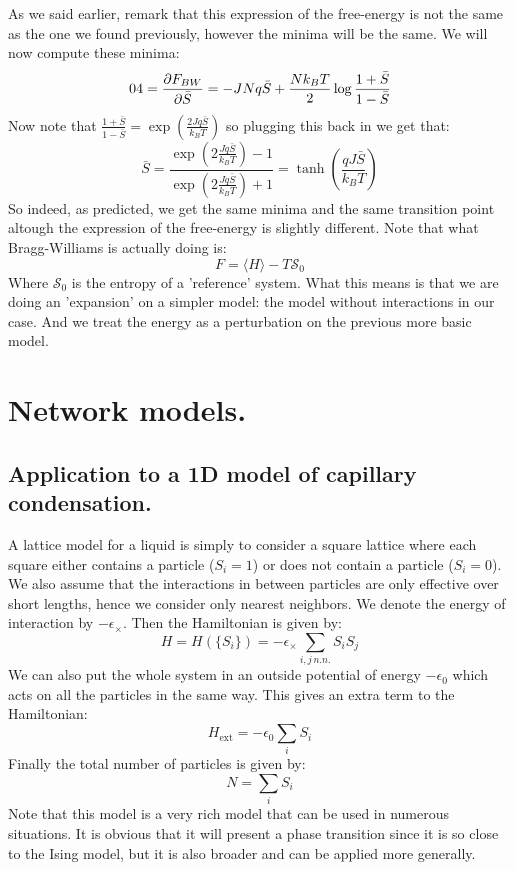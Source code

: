 \documentclass[10pt,a4paper]{book}
\begin{document}
As we said earlier, remark that this expression of the free-energy is not the same as the one we found previously, however the minima will be the same. We will now compute these minima:
\[
04 = \pdv{F_{BW}}{\bar{S}} = - J N q \bar{S} + \frac{N k_B T}{2} \log \frac{1 + \bar{S}}{1 - \bar{S}}
\]
Now note that $\frac{1 + \bar{S}}{1 - \bar{S}} = \exp(\frac{2 J q \bar{S}}{k_B T})$ so plugging this back in we get that:
\[
\bar{S} = \frac{\exp(2 \frac{J q \bar{S}}{k_B T}) - 1}{\exp(2\frac{J q \bar{S}}{k_B T}) + 1} = \tanh(\frac{q J \bar{S}}{k_B T})
\]
So indeed, as predicted, we get the same minima and the same transition point altough the expression of the free-energy is slightly different. Note that what Bragg-Williams is actually doing is:
\[
F = \langle H \rangle - T \mathcal{S}_0
\]
Where $\mathcal{S}_0$ is the entropy of a 'reference' system. What this means is that we are doing an 'expansion' on a simpler model: the model without interactions in our case. And we treat the energy as a perturbation on the previous more basic model.

\section{Network models.}
\subsection{Application to a 1D model of capillary condensation.}
A lattice model for a liquid is simply to consider a square lattice where each square either contains a particle ($S_i = 1$)  or does not contain a particle ($S_i = 0$). We also assume that the interactions in between particles are only effective over short lengths, hence we consider only nearest neighbors. We denote the energy of interaction by $-\epsilon_\times$. Then the Hamiltonian is given by:
\[
H = H(\{S_i\}) = -\epsilon_\times \sum_{i,j\, n.n.} S_i S_j
\]
We can also put the whole system in an outside potential of energy $-\epsilon_0$ which acts on all the particles in the same way. This gives an extra term to the Hamiltonian:
\[
H_\text{ext} = - \epsilon_0 \sum_i S_i
\]
Finally the total number of particles is given by:
\[
N = \sum_i S_i
\]
Note that this model is a very rich model that can be used in numerous situations. It is obvious that it will present a phase transition since it is so close to the Ising model, but it is also broader and can be applied more generally.
\end{document}
